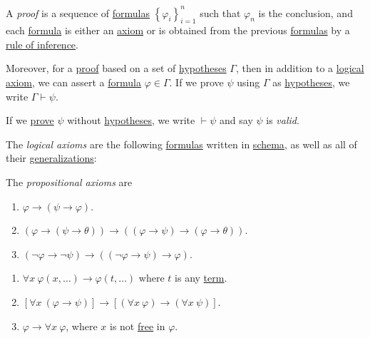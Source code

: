 \begin{definition}[Proof]\label{def:proof}
	A \emph{proof} is a sequence of \hyperref[def:formula]{formulas} \(\left\{ \varphi _i \right\} _{i=1}^n\) such that \(\varphi _n\) is the conclusion, and each \hyperref[def:formula]{formula} is either an \hyperref[def:logical-axioms]{axiom} or is obtained from the previous \hyperref[def:formula]{formulas} by a \hyperref[def:rule-of-inference]{rule of inference}.

	Moreover, for a \hyperref[def:proof]{proof} based on a set of \hyperref[not:hypothesis]{hypotheses} \(\Gamma \), then in addition to a \hyperref[def:logical-axioms]{logical axiom}, we can assert a \hyperref[def:formula]{formula} \(\varphi \in \Gamma \). If we prove \(\psi \) using \(\Gamma \) as \hyperref[not:hypothesis]{hypotheses}, we write \(\Gamma \vdash \psi \).

	\begin{definition}[Valid]\label{def:valid}
		If we \hyperref[def:proof]{prove} \(\psi \) without \hyperref[not:hypothesis]{hypotheses}, we write \(\vdash \psi \) and say \(\psi \) is \emph{valid}.
	\end{definition}

	\begin{definition}\label{def:logical-axioms}
		The \emph{logical axioms} are the following \hyperref[def:formula]{formulas} written in \hyperref[not:schema]{schema}, as well as all of their \hyperref[def:generalization]{generalizations}:
		\begin{definition}\label{def:propositional-axioms}
			The \emph{propositional axioms} are
			\begin{enumerate}[label=(A\arabic*), resume*]
				\item\label{A1} \(\varphi \to  (\psi \to \varphi )\).
				\item\label{A2} \((\varphi \to (\psi \to \theta )) \to ((\varphi \to  \psi ) \to (\varphi \to \theta ))\).
				\item\label{A3} \((\lnot \varphi \to \lnot \psi ) \to  ((\lnot \varphi \to \psi ) \to \varphi )\).
			\end{enumerate}
		\end{definition}

		\begin{enumerate}[label=(A\arabic*), resume]
			\item\label{A4} \(\forall x\ \varphi (x, \ldots ) \to \varphi (t, \ldots )\) where \(t\) is any \hyperref[def:term]{term}.
			\item\label{A5} \(\left[ \forall x\ (\varphi \to \psi ) \right] \to \left[ (\forall x\ \varphi ) \to (\forall x\ \psi ) \right] \).
			\item\label{A6} \(\varphi \to  \forall x\ \varphi \), where \(x\) is not \hyperref[def:free-variable]{free} in \(\varphi \).
		\end{enumerate}


\end{definition}
\end{definition}
